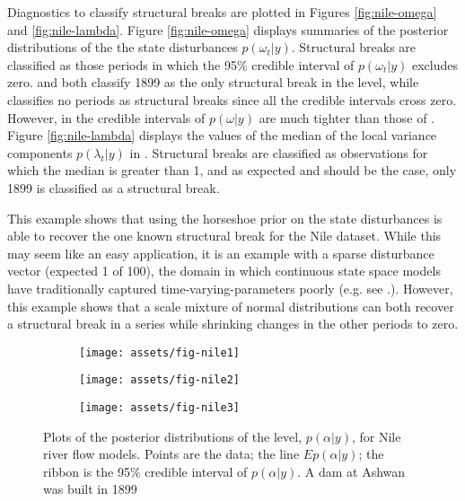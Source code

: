 \documentclass{article}
\begin{document}
Diagnostics to classify structural breaks are plotted in Figures \ref{fig:nile-omega} and \ref{fig:nile-lambda}.
Figure \ref{fig:nile-omega} displays summaries of the posterior distributions of the the state disturbances $p(\omega_{t} | y)$.
Structural breaks are classified as those periods in which the 95\% credible interval of $p(\omega_{t} | y)$ excludes zero.
 and  both classify 1899 as the only structural break in the level, while  classifies no periods as structural breaks since all the credible intervals cross zero.
However, in  the credible intervals of $p(\omega|y)$ are much tighter than those of .
Figure \ref{fig:nile-lambda} displays the values of the median of the local variance components $p(\lambda_{t} | y)$ in .
Structural breaks are classified as observations for which the median is greater than 1, and as expected and should be the case, only 1899 is classified as a structural break.

This example shows that using the horseshoe prior on the state disturbances is able to recover the one known structural break for the Nile dataset.
While this may seem like an easy application, it is an example with a sparse disturbance vector (expected 1 of 100), the domain in which continuous state space models have traditionally captured time-varying-parameters poorly (e.g. see .).
However, this example shows that a scale mixture of normal distributions can both recover a structural break in a series while shrinking changes in the other periods to zero.

\begin{figure}[htpb]
  \centering
  \begin{subfigure}{1.0\textwidth}
    \texttt{[image: assets/fig-nile1]}
    \caption{}
    \label{fig:nile-posterior-1}    
  \end{subfigure}
  \begin{subfigure}{1.0\textwidth}
    \texttt{[image: assets/fig-nile2]}
    \caption{}
    \label{fig:nile-posterior-2}
  \end{subfigure}
  \begin{subfigure}{1.0\textwidth}
    \texttt{[image: assets/fig-nile3]}
    \caption{}
    \label{fig:nile-posterior-3}
  \end{subfigure}
  \caption{Plots of the posterior distributions of the level, $p(\alpha | y)$, for Nile river flow models. Points are the data; the line $E p(\alpha | y)$; the ribbon is the 95\% credible interval of $p(\alpha | y)$. A dam at Ashwan was built in 1899}
  \label{fig:nile-posterior}
\end{figure}
\end{document}
